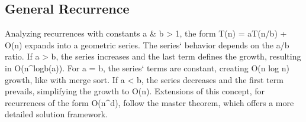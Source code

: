 \subsection*{General Recurrence}
Analyzing recurrences with constants a \& b \textgreater{} 1, the form T(n) = aT(n/b) + O(n) expands into a geometric series.
The series` behavior depends on the a/b ratio.
If a \textgreater{} b, the series increases and the last term defines the growth, resulting in O(n\textasciicircum{}logb(a)).
For a = b, the series` terms are constant, creating O(n log n) growth, like with merge sort.
If a \textless{} b, the series decreases and the first term prevails, simplifying the growth to O(n).
Extensions of this concept, for recurrences of the form O(n\textasciicircum{}d), follow the master theorem, which offers a more detailed solution framework.

